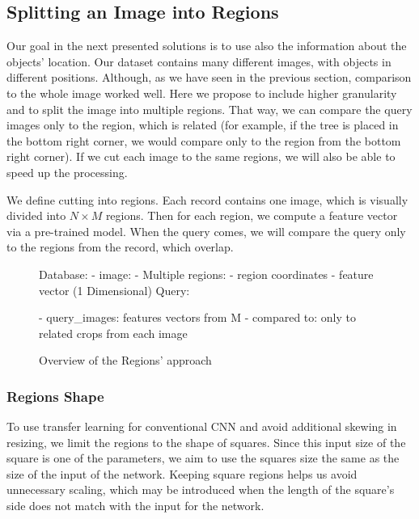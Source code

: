 \subsection{Splitting an Image into Regions}

Our goal in the next presented solutions is to use also the information about the objects' location. Our dataset contains many different images, with objects in different positions. Although, as we have seen in the previous section, comparison to the whole image worked well. Here we propose to include higher granularity and to split the image into multiple regions. That way, we can compare the query images only to the region, which is related (for example, if the tree is placed in the bottom right corner, we would compare only to the region from the bottom right corner). If we cut each image to the same regions, we will also be able to speed up the processing.

We define cutting into regions. Each record contains one image, which is visually divided into  $N \times M$ regions. Then for each region, we compute a feature vector via a pre-trained model. When the query comes, we will compare the query only to the regions from the record, which overlap.

\begin{figure}
\centering
\begin{boxedverbatim}
Database:
    - image:
        - Multiple regions:
            - region coordinates
            - feature vector (1 Dimensional)
Query:


    - query_images: features vectors from M
    - compared to: only to related crops from each image
\end{boxedverbatim}
\caption{Overview of the Regions' approach}
\end{figure}

\subsubsection{Regions Shape}

To use transfer learning for conventional CNN and avoid additional skewing in resizing, we limit the regions to the shape of squares. Since this input size of the square is one of the parameters, we aim to use the squares size the same as the size of the input of the network. Keeping square regions helps us avoid unnecessary scaling, which may be introduced when the length of the square's side does not match with the input for the network.

